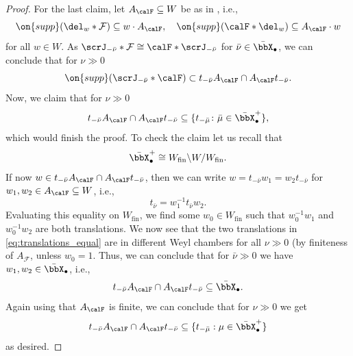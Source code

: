 \documentclass[10pt, reqno]{amsart}
\theoremstyle{plain}
\theoremstyle{definition}
\numberwithin{equation}{section}
\begin{document}
\begin{proof}
		For the last claim, let $A_{\calF}\subseteq W$ be as in , i.e.,
		\begin{equation}
			\on{supp}(\del_w\ast \mathcal{F})\subseteq w\cdot A_\calF,\quad \on{supp}(\calF\ast \del_w)\subseteq A_\calF\cdot w
		\end{equation}
		for all $w\in W$.
		As $\scrJ_{-\bar\nu}\ast \mathcal{F}\cong \calF\ast \scrJ_{-\bar\nu}$ for $\bar\nu\in \bar\bbX_\bullet$, we can conclude that for $\nu\gg 0$
		\begin{equation}
			\on{supp}(\scrJ_{-\bar\nu} \ast \calF)\subset t_{-\bar\nu}A_\calF \cap A_\calF t_{-\bar\nu}.
		\end{equation}
		Now, we claim that for $\nu \gg 0$
		\begin{equation}
			t_{-\bar\nu}A_{\calF}\cap A_\calF t_{-\bar\nu}\subseteq \{t_{-\bar \mu} \colon \bar\mu\in\bar\bbX_\bullet^+\},
		\end{equation}
		which would finish the proof. To check the claim let us recall that
		\begin{equation}
			\label{eq:1}
			\bar\bbX^+_\bullet\cong W_{\rm{fin}}\backslash W/W_{\rm{fin}}.
		\end{equation}
		If now $w\in t_{-\bar\nu}A_\calF\cap A_\calF t_{-\bar\nu}$, then we can write $w=t_{-\bar\nu}w_1=w_2t_{-\bar\nu}$ for $w_1,w_2\in A_\calF\subseteq W$, i.e.,
		\begin{equation}\label{eq:translations_equal}
			t_{\bar\nu}=w_1^{-1}t_{\bar\nu}w_2.
		\end{equation}
		Evaluating this equality on $W_{\mathrm{fin}}$, we find some $w_0 \in W_{\mathrm{fin}}$ such that $w_0^{-1}w_1$ and $w_0^{-1}w_2$ are both translations. We now see that the two translations in \eqref{eq:translations_equal} are in different Weyl chambers for all $\nu\gg 0$ (by finiteness of $A_{\mathcal{F}}$, unless $w_0=1$. Thus, we can conclude that for $\bar \nu\gg 0$ we have $w_1,w_2\in \bar\bbX_\bullet$, i.e.,
		\begin{equation}
			t_{-\bar\nu}A_\calF\cap A_\calF t_{-\bar\nu}\subseteq \bar\bbX_{\bullet}.
		\end{equation}
		Again using that $A_\calF$ is finite, we can conclude that for $\nu \gg 0$ we get
		\begin{equation}
			t_{-\bar\nu}A_\calF\cap A_\calF t_{-\bar\nu}\subseteq \{t_{-\bar\mu} : \mu\in \bar\bbX^+_\bullet\}
		\end{equation}
		as desired. 
	\end{proof}
	
\end{document}
